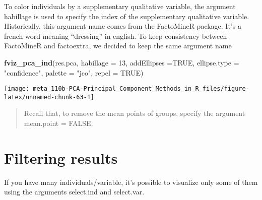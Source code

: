 \documentclass[]{book}
\newenvironment{Shaded}{\begin{snugshade}}{\end{snugshade}}
\newcommand{\DataTypeTok}[1]{\textcolor[rgb]{0.13,0.29,0.53}{#1}}
\newcommand{\DecValTok}[1]{\textcolor[rgb]{0.00,0.00,0.81}{#1}}
\newcommand{\KeywordTok}[1]{\textcolor[rgb]{0.13,0.29,0.53}{\textbf{#1}}}
\newcommand{\NormalTok}[1]{#1}
\newcommand{\OtherTok}[1]{\textcolor[rgb]{0.56,0.35,0.01}{#1}}
\newcommand{\StringTok}[1]{\textcolor[rgb]{0.31,0.60,0.02}{#1}}
\begin{document}
To color individuals by a supplementary qualitative variable, the argument habillage is used to specify the index of the supplementary qualitative variable. Historically, this argument name comes from the FactoMineR package. It's a french word meaning ``dressing'' in english. To keep consistency between FactoMineR and factoextra, we decided to keep the same argument name

\begin{Shaded}
\begin{Highlighting}[]
\KeywordTok{fviz_pca_ind}\NormalTok{(res.pca, }\DataTypeTok{habillage =} \DecValTok{13}\NormalTok{,}
             \DataTypeTok{addEllipses =}\OtherTok{TRUE}\NormalTok{, }\DataTypeTok{ellipse.type =} \StringTok{"confidence"}\NormalTok{,}
             \DataTypeTok{palette =} \StringTok{"jco"}\NormalTok{, }\DataTypeTok{repel =} \OtherTok{TRUE}\NormalTok{) }
\end{Highlighting}
\end{Shaded}

\begin{center}\texttt{[image: meta\_110b-PCA-Principal\_Component\_Methods\_in\_R\_files/figure-latex/unnamed-chunk-63-1]} \end{center}

\begin{quote}
Recall that, to remove the mean points of groups, specify the argument mean.point = FALSE.
\end{quote}

\hypertarget{filtering-results}{%
\section{Filtering results}\label{filtering-results}}

If you have many individuals/variable, it's possible to visualize only some of them using the arguments select.ind and select.var.
\end{document}
